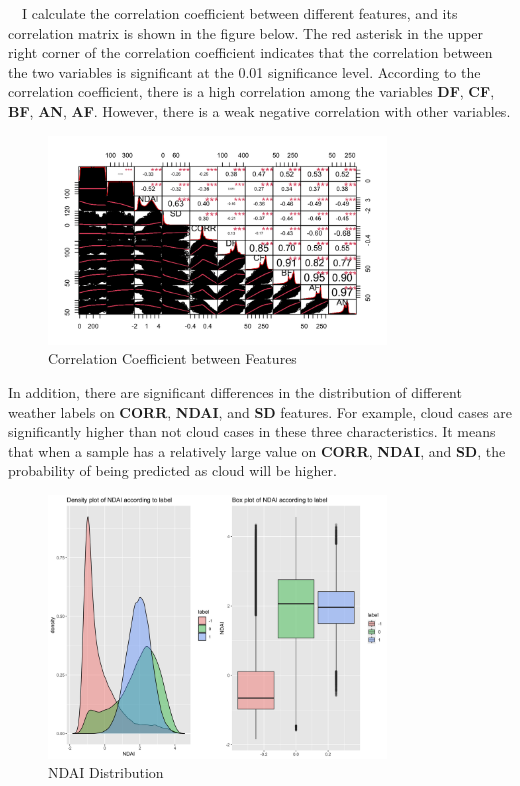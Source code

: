 \documentclass[11pt]{article}
\begin{document}
\quad\ \  I calculate the correlation coefficient between different features, and its correlation matrix is shown in the figure below. The red asterisk in the upper right corner of the correlation coefficient indicates that the correlation between the two variables is significant at the 0.01 significance level. According to the correlation coefficient, there is a high correlation among the variables \textbf{DF}, \textbf{CF}, \textbf{BF}, \textbf{AN}, \textbf{AF}. However, there is a weak negative correlation with other variables.

\begin{figure}[H]
  \centering
      \includegraphics[width=0.8\textwidth, height=0.5\textwidth]{../figures/coefficient.png}     
   \caption{Correlation Coefficient between Features}
\end{figure}

In addition, there are significant differences in the distribution of different weather labels on \textbf{CORR}, \textbf{NDAI}, and \textbf{SD} features. For example, cloud cases are significantly higher than not cloud cases in these three characteristics. It means that when a sample has a relatively large value on \textbf{CORR}, \textbf{NDAI}, and \textbf{SD}, the probability of being predicted as cloud will be higher.

\begin{figure}[h]
  \centering
      \includegraphics[width=0.8\textwidth, height=0.5\textwidth]{../figures/NDAI_dis.png}
  \caption{NDAI Distribution}
\end{figure}
\end{document}

